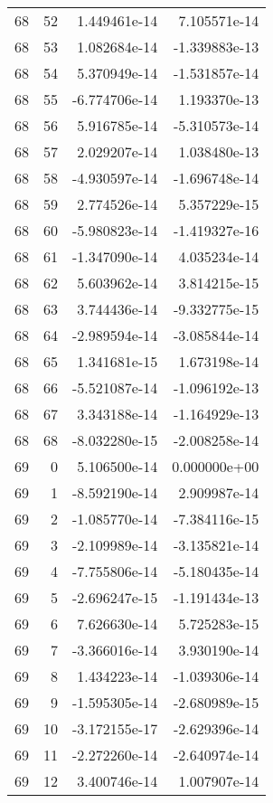 \begin{tabular}{rrrr}
  68 &   52 &  1.449461e-14 &  7.105571e-14 \\
  68 &   53 &  1.082684e-14 & -1.339883e-13 \\
  68 &   54 &  5.370949e-14 & -1.531857e-14 \\
  68 &   55 & -6.774706e-14 &  1.193370e-13 \\
  68 &   56 &  5.916785e-14 & -5.310573e-14 \\
  68 &   57 &  2.029207e-14 &  1.038480e-13 \\
  68 &   58 & -4.930597e-14 & -1.696748e-14 \\
  68 &   59 &  2.774526e-14 &  5.357229e-15 \\
  68 &   60 & -5.980823e-14 & -1.419327e-16 \\
  68 &   61 & -1.347090e-14 &  4.035234e-14 \\
  68 &   62 &  5.603962e-14 &  3.814215e-15 \\
  68 &   63 &  3.744436e-14 & -9.332775e-15 \\
  68 &   64 & -2.989594e-14 & -3.085844e-14 \\
  68 &   65 &  1.341681e-15 &  1.673198e-14 \\
  68 &   66 & -5.521087e-14 & -1.096192e-13 \\
  68 &   67 &  3.343188e-14 & -1.164929e-13 \\
  68 &   68 & -8.032280e-15 & -2.008258e-14 \\
  69 &    0 &  5.106500e-14 &  0.000000e+00 \\
  69 &    1 & -8.592190e-14 &  2.909987e-14 \\
  69 &    2 & -1.085770e-14 & -7.384116e-15 \\
  69 &    3 & -2.109989e-14 & -3.135821e-14 \\
  69 &    4 & -7.755806e-14 & -5.180435e-14 \\
  69 &    5 & -2.696247e-15 & -1.191434e-13 \\
  69 &    6 &  7.626630e-14 &  5.725283e-15 \\
  69 &    7 & -3.366016e-14 &  3.930190e-14 \\
  69 &    8 &  1.434223e-14 & -1.039306e-14 \\
  69 &    9 & -1.595305e-14 & -2.680989e-15 \\
  69 &   10 & -3.172155e-17 & -2.629396e-14 \\
  69 &   11 & -2.272260e-14 & -2.640974e-14 \\
  69 &   12 &  3.400746e-14 &  1.007907e-14 \\

\end{tabular}
